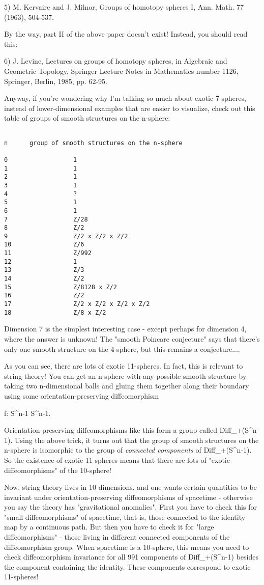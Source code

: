5) M. Kervaire and J. Milnor, Groups of homotopy spheres I, Ann. Math.
77 (1963), 504-537.

By the way, part II of the above paper doesn't exist!  Instead, you 
should read this:

6) J. Levine, Lectures on groups of homotopy spheres, in Algebraic and
Geometric Topology, Springer Lecture Notes in Mathematics number
1126, Springer, Berlin, 1985, pp. 62-95.

Anyway, if you're wondering why I'm talking so much about exotic 7-spheres,
instead of lower-dimensional examples that are easier to visualize, check 
out this table of groups of smooth structures on the n-sphere: 


\begin{verbatim}

n      group of smooth structures on the n-sphere

0                  1
1                  1
2                  1
3                  1
4                  ?
5                  1
6                  1
7                  Z/28 
8                  Z/2 
9                  Z/2 x Z/2 x Z/2
10                 Z/6
11                 Z/992
12                 1
13                 Z/3
14                 Z/2
15                 Z/8128 x Z/2
16                 Z/2
17                 Z/2 x Z/2 x Z/2 x Z/2 
18                 Z/8 x Z/2
\end{verbatim}
    
Dimension 7 is the simplest interesting case - except perhaps for
dimension 4, where the answer is unknown!   The "smooth Poincare
conjecture" says that there's only one smooth structure on the
4-sphere, but this remains a conjecture....

As you can see, there are lots of exotic 11-spheres.  In fact, this is
relevant to string theory!  You can get an n-sphere with any possible 
smooth structure by taking two n-dimensional balls and gluing them together 
along their boundary using some orientation-preserving diffeomorphism

f: S^{n-1} \to  S^{n-1}.

Orientation-preserving diffeomorphisms like this form a group called
Diff_{+}(S^{n-1}).  Using the above trick, it turns out
that the group of smooth structures on the n-sphere is isomorphic to the
group of \emph{connected components} of Diff_{+}(S^{n-1}).
So the existence of exotic 11-spheres means that there are lots of
"exotic diffeomorphisms" of the 10-sphere!

Now, string theory lives in 10 dimensions, and one wants certain
quantities to be invariant under orientation-preserving diffeomorphisms
of spacetime - otherwise you say the theory has "gravitational
anomalies".  First you have to check this for "small
diffeomorphisms" of spacetime, that is, those connected to the
identity map by a continuous path.  But then you have to check it for
"large diffeomorphisms" - those living in different connected
components of the diffeomorphism group.  When spacetime is a 10-sphere,
this means you need to check diffeomorphism invariance for all 991
components of Diff_{+}(S^{n-1}) besides the component
containing the identity.  These components correspond to exotic
11-spheres!

